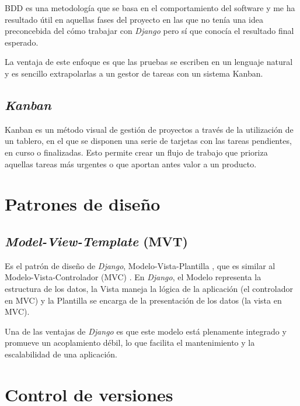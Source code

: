 BDD \citep{wiki:BDD} es una metodología que se basa en el comportamiento del software y me ha resultado útil 
en aquellas fases del proyecto en las que no tenía una idea preconcebida del cómo trabajar con \emph{Django} 
pero sí que conocía el resultado final esperado. 

La ventaja de este enfoque es que las pruebas se escriben en un lenguaje natural y es sencillo extrapolarlas a 
un gestor de tareas con un sistema Kanban. 

\subsection{\emph{Kanban}}\label{kanban}

Kanban \citep{wiki:Kanban} es un método visual de gestión de proyectos a través de la utilización de un tablero, 
en el que se disponen una serie de tarjetas con las tareas pendientes, en curso o finalizadas. Esto permite crear 
un flujo de trabajo que prioriza aquellas tareas más urgentes o que aportan antes valor a un producto.  



\section{Patrones de diseño}\label{patrones_diseno}

\subsection{\emph{Model-View-Template} (MVT)}\label{model_view_template}

Es el patrón de diseño de \emph{Django}, Modelo-Vista-Plantilla \citep{online:django_MVT_1,online:django_MVT_2}, que 
es similar al Modelo-Vista-Controlador (MVC) \citep{wiki:modelo_MVC}. En \emph{Django}, el Modelo representa la 
estructura de los datos, la Vista maneja la lógica de la aplicación (el controlador en MVC) y la Plantilla se encarga 
de la presentación de los datos (la vista en MVC). 

Una de las ventajas de \emph{Django} es que este modelo está plenamente integrado y promueve un acoplamiento 
débil, lo que facilita el mantenimiento y la escalabilidad de una aplicación. 




\section{Control de versiones}\label{control_versiones}

